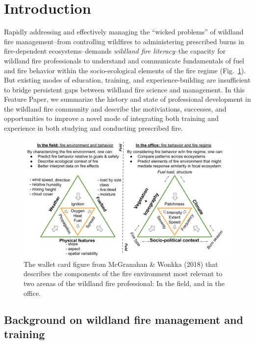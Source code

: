 \documentclass[fire,article,submit,moreauthors,pdftex]{Definitions/mdpi}
\begin{document}
\hypertarget{introduction}{%
\section{Introduction}\label{introduction}}

Rapidly addressing and effectively managing the ``wicked problems'' of wildland fire management--from controlling wildfires to administering prescribed burns in fire-dependent ecosystems--demands \emph{wildland fire literacy}--the capacity for wildland fire professionals to understand and communicate fundamentals of fuel and fire behavior within the socio-ecological elements of the fire regime (Fig.~\ref{WalletCard}).
But existing modes of education, training, and experience-building are insufficient to bridge persistent gaps between wildland fire science and management.
In this Feature Paper, we summarize the history and state of professional development in the wildland fire community and describe the motiviations, successes, and opportunities to improve a novel mode of integrating both training and experience in both studying and conducting prescribed fire.

\begin{figure}[H]
\centering
\includegraphics[width=1\columnwidth]{WalletCard.pdf}
\caption{The wallet card figure from McGranahan \& Wonkka (2018) that describes the components of the fire environment most relevant to two arenas of the wildland fire professional: In the field, and in the office.}
\label{WalletCard}
\end{figure}

\hypertarget{background-on-wildland-fire-management-and-training}{%
\subsection{Background on wildland fire management and training}\label{background-on-wildland-fire-management-and-training}}
\end{document}
